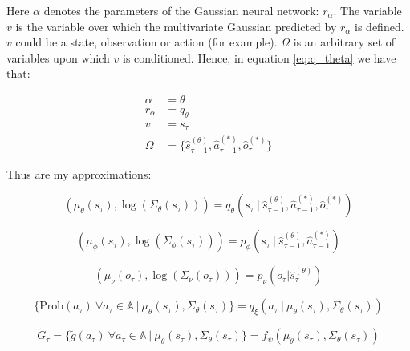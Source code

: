 \documentclass{article}
\begin{document}
Here $\alpha$ denotes the parameters of the Gaussian neural network: $r_{\alpha}$. The variable $v$ is the variable over which the multivariate Gaussian predicted by $r_{\alpha}$ is defined. $v$ could be a state, observation or action (for example). $\Omega$ is an arbitrary set of variables upon which $v$ is conditioned. Hence, in equation \ref{eq:q_theta} we have that:

\begin{equation}
    \begin{aligned}
        \label{eq:gauss_model_example}
        \alpha &= \theta \\
        r_{\alpha} &= q_{\theta} \\
        v &= s_{\tau} \\
        \Omega &= \{\hat{s}_{\tau - 1}^{(\theta)}, \hat{a}_{\tau - 1}^{(*)}, \hat{o}_{\tau}^{(*)}\}
    \end{aligned}
\end{equation}

Thus are my approximations:

\begin{equation}
    \label{eq:q_theta}
    (\mu_{\theta}(s_{\tau}), \log{(\Sigma_{\theta}(s_{\tau}))}) = q_{\theta}(s_{\tau} \ | \ \hat{s}_{\tau - 1}^{(\theta)}, \hat{a}_{\tau - 1}^{(*)}, \hat{o}_{\tau}^{(*)})
\end{equation}

\begin{equation}
    \label{eq:p_phi}
    (\mu_{\phi}(s_{\tau}), \log{(\Sigma_{\phi}(s_{\tau}))}) = p_{\phi}(s_{\tau} \ | \ \hat{s}_{\tau - 1}^{(\theta)}, \hat{a}_{\tau - 1}^{(*)})
\end{equation}

\begin{equation}
    \label{eq:p_nu}
    (\mu_{\nu}(o_{\tau}), \log{(\Sigma_{\nu}(o_{\tau}))}) = p_{\nu}(o_{\tau} | \hat{s}_{\tau}^{(\theta)})
\end{equation}

\begin{equation}
    \label{eq:q_xi}
    \{\text{Prob}(a_{\tau}) \ \forall a_{\tau} \in \mathbb{A} \ | \ \mu_{\theta}(s_{\tau}), \Sigma_{\theta}(s_{\tau})\} = q_{\xi}(a_{\tau} \ | \ \mu_{\theta}(s_{\tau}), \Sigma_{\theta}(s_{\tau}))
\end{equation}

\begin{equation}
    \label{eq:efe_est}
    \tilde{G}_{\tau} = \{\tilde{g}(a_{\tau}) \ \forall a_{\tau} \in \mathbb{A} \ | \ \mu_{\theta}(s_{\tau}), \Sigma_{\theta}(s_{\tau})\} = f_{\psi}(\mu_{\theta}(s_{\tau}), \Sigma_{\theta}(s_{\tau}))
\end{equation}
\end{document}
